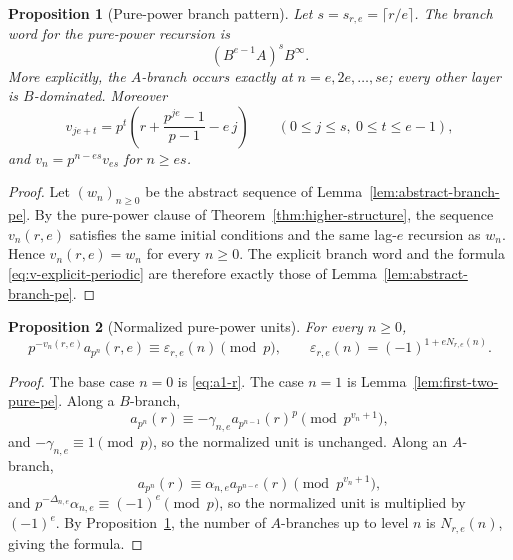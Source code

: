 \documentclass[11pt]{amsart}
\numberwithin{equation}{section}
\newtheorem{proposition}[proposition]{Proposition}
\begin{document}
\begin{proposition}[Pure-power branch pattern]\label{prop:branch-pattern-pe}
Let $s=s_{r,e}=\lceil r/e\rceil$.  The branch word for the pure-power recursion is
\[
        (B^{e-1}A)^sB^\infty.
\]
More explicitly, the $A$-branch occurs exactly at $n=e,2e,\ldots,se$; every other layer is $B$-dominated.  Moreover
\begin{equation}\label{eq:v-explicit-periodic}
        v_{je+t}=p^t\left(r+\frac{p^{j e}-1}{p-1}-e\,j\right)
        \qquad(0\le j\le s,\ 0\le t\le e-1),
\end{equation}
and $v_n=p^{n-e s}v_{e s}$ for $n\ge e s$.
\end{proposition}
\begin{proof}
Let $(w_n)_{n\ge0}$ be the abstract sequence of Lemma~\ref{lem:abstract-branch-pe}.  By the pure-power clause of Theorem~\ref{thm:higher-structure}, the sequence $v_n(r,e)$ satisfies the same initial conditions and the same lag-$e$ recursion as $w_n$.  Hence $v_n(r,e)=w_n$ for every $n\ge0$.  The explicit branch word and the formula \eqref{eq:v-explicit-periodic} are therefore exactly those of Lemma~\ref{lem:abstract-branch-pe}.
\end{proof}

\begin{proposition}[Normalized pure-power units]\label{prop:pure-units-pe}
For every $n\ge0$,
\[
        p^{-v_n(r,e)}a_{p^n}(r,e)\equiv \varepsilon_{r,e}(n)\pmod p,
        \qquad
        \varepsilon_{r,e}(n)=(-1)^{1+eN_{r,e}(n)}.
\]
\end{proposition}
\begin{proof}
The base case $n=0$ is \eqref{eq:a1-r}.  The case $n=1$ is Lemma~\ref{lem:first-two-pure-pe}.  Along a $B$-branch,
\[
        a_{p^n}(r)\equiv-\gamma_{n,e}a_{p^{n-1}}(r)^p
        \pmod{p^{v_n+1}},
\]
and $-\gamma_{n,e}\equiv1\pmod p$, so the normalized unit is unchanged.  Along an $A$-branch,
\[
        a_{p^n}(r)\equiv\alpha_{n,e}a_{p^{n-e}}(r)
        \pmod{p^{v_n+1}},
\]
and $p^{-\Delta_{n,e}}\alpha_{n,e}\equiv(-1)^e\pmod p$, so the normalized unit is multiplied by $(-1)^e$.  By Proposition~\ref{prop:branch-pattern-pe}, the number of $A$-branches up to level $n$ is $N_{r,e}(n)$, giving the formula.
\end{proof}
\end{document}
